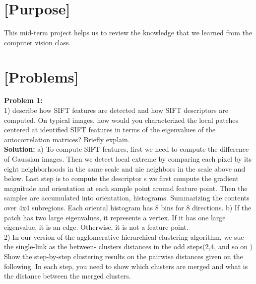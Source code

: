\documentclass{article}
\begin{document}
\section*{[Purpose]}
This mid-term project helps us to review the knowledge that we learned from the computer vision class.



\section*{[Problems]}
\textbf{Problem 1:}\\
1) describe how SIFT features are detected and how SIFT descriptors are computed. On typical images, how would you characterized the local patches centered at identified SIFT features in terms of the eigenvalues of the autocorrelation matrices? Briefly explain.\\
\textbf{Solution:} 
a) To compute SIFT features, first we need to compute the difference of Gaussian images. Then we detect local extreme by comparing each pixel by its eight neighborhoods in the same scale and nie neighbors in the scale above and below. Last step is to compute the descriptor s we first compute the gradient magnitude and orientation at each sample point around feature point. Then the samples are accumulated into orientation, histograms. Summarizing the contents over 4x4 subregions. Each oriental histogram has 8 bins for 8 directions. b) If the patch has two large eigenvalues, it represents a vertex. If it has one large eigenvalue, it is an edge. Otherwise, it is not a feature point.\\

2) In our version of the agglomerative hierarchical clustering algorithm, we sue the single-link as the between- clusters distances in the odd steps(2,4, and so on ) Show the step-by-step clustering results on the pairwise distances given on the following. In each step, you need to show which clusters are merged and what is the distance between the merged clusters. \\
\end{document}
